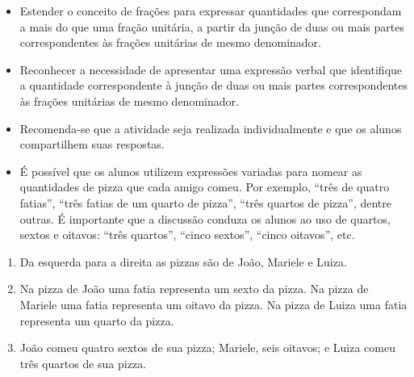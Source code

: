 \pagebreak

\begin{objetivos}[code={\setcounter{tcb@cnt@objetivos}{0}}]{}{}  %
  \begin{itemize} %
\item Estender o conceito de frações para expressar quantidades que correspondam a mais do que uma fração unitária, a partir da junção de duas ou mais partes correspondentes às frações unitárias de mesmo denominador.
\item Reconhecer a necessidade de apresentar uma expressão verbal que identifique a quantidade correspondente à junção de duas ou mais partes correspondentes às frações unitárias de mesmo denominador.
  \end{itemize} %
\end{objetivos}

\begin{orientacoes}
  \begin{itemize} %
\item Recomenda-se que a atividade seja realizada individualmente e que os alunos compartilhem suas respostas. 
\item É possível que os alunos utilizem expressões variadas para nomear as quantidades de pizza que cada amigo comeu. Por exemplo, ``três de quatro fatias'', ``três fatias de um quarto de pizza'', ``três quartos de pizza'', dentre outras. É importante que a discussão conduza os alunos ao uso de quartos, sextos e oitavos: ``três quartos'', ``cinco sextos'', ``cinco oitavos'', etc. 
\end{itemize} %
\end{orientacoes}

\begin{solucao}[code={\setcounter{tcb@cnt@solucao}{0}}]{}{}
\begin{enumerate} [\quad a)] %
\item Da esquerda para a direita as pizzas são de João, Mariele e Luiza.
\item Na pizza de João uma fatia representa um sexto da pizza. \newline
  Na pizza de Mariele uma fatia representa um oitavo da pizza. \newline
  Na pizza de Luiza uma fatia representa um quarto da pizza.
\item João comeu quatro sextos de sua pizza; Mariele, seis oitavos; e Luiza comeu três quartos de sua pizza.
\end{enumerate} %
\end{solucao}
\vfill


